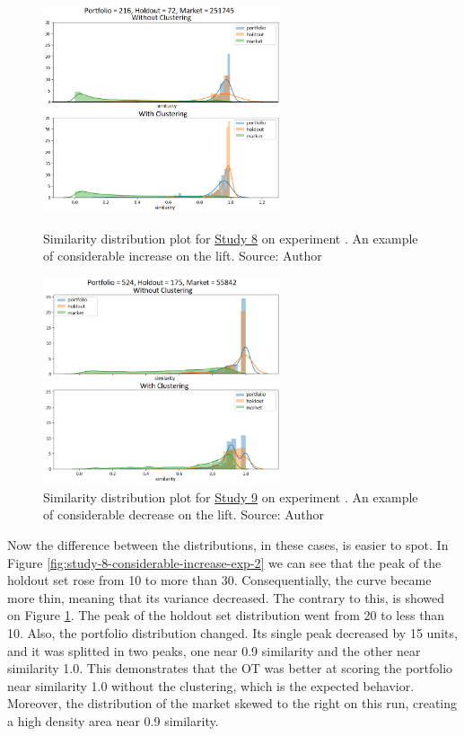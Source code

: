 \begin{figure}[h]
   \centering
   \includegraphics[width=7cm]{fig/ch4-study-8-considerable-increase-exp-2.png}
   \caption{Similarity distribution plot for \underline{Study 8} on experiment \nameExperimentII{}. An example of considerable increase on the lift. Source: Author}
   \label{fig:study-8-considerable-increase-exp-2}

   \includegraphics[width=7cm]{fig/ch4-study-9-considerable-decrease-exp-1.png}
   \caption{Similarity distribution plot for \underline{Study 9} on experiment \nameExperimentI{}. An example of considerable decrease on the lift. Source: Author}
   \label{fig:study-9-considerable-decrease-exp-1}
\end{figure}

Now the difference between the distributions, in these cases, is easier to spot. In Figure \ref{fig:study-8-considerable-increase-exp-2} we can see that the peak of the holdout set rose from 10 to more than 30. Consequentially, the curve became more thin, meaning that its variance decreased. The contrary to this, is showed on Figure \ref{fig:study-9-considerable-decrease-exp-1}. The peak of the holdout set distribution went from 20 to less than 10. Also, the portfolio distribution changed. Its single peak decreased by 15 units, and it was splitted in two peaks, one near 0.9 similarity and the other near similarity 1.0. This demonstrates that the OT was better at scoring the portfolio near similarity 1.0 without the clustering, which is the expected behavior. Moreover, the distribution of the market skewed to the right on this run, creating a high density area near 0.9 similarity. 

